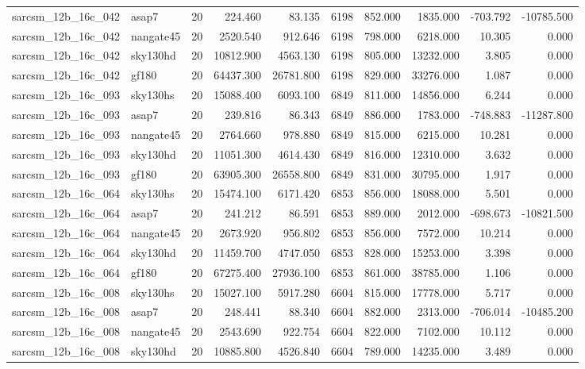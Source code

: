 \begin{tabular}{llrrrrrrrr}
sarcsm\_12b\_16c\_042 & asap7 & 20 & 224.460 & 83.135 & 6198 & 852.000 & 1835.000 & -703.792 & -10785.500 \\
sarcsm\_12b\_16c\_042 & nangate45 & 20 & 2520.540 & 912.646 & 6198 & 798.000 & 6218.000 & 10.305 & 0.000 \\
sarcsm\_12b\_16c\_042 & sky130hd & 20 & 10812.900 & 4563.130 & 6198 & 805.000 & 13232.000 & 3.805 & 0.000 \\
sarcsm\_12b\_16c\_042 & gf180 & 20 & 64437.300 & 26781.800 & 6198 & 829.000 & 33276.000 & 1.087 & 0.000 \\
sarcsm\_12b\_16c\_093 & sky130hs & 20 & 15088.400 & 6093.100 & 6849 & 811.000 & 14856.000 & 6.244 & 0.000 \\
sarcsm\_12b\_16c\_093 & asap7 & 20 & 239.816 & 86.343 & 6849 & 886.000 & 1783.000 & -748.883 & -11287.800 \\
sarcsm\_12b\_16c\_093 & nangate45 & 20 & 2764.660 & 978.880 & 6849 & 815.000 & 6215.000 & 10.281 & 0.000 \\
sarcsm\_12b\_16c\_093 & sky130hd & 20 & 11051.300 & 4614.430 & 6849 & 816.000 & 12310.000 & 3.632 & 0.000 \\
sarcsm\_12b\_16c\_093 & gf180 & 20 & 63905.300 & 26558.800 & 6849 & 831.000 & 30795.000 & 1.917 & 0.000 \\
sarcsm\_12b\_16c\_064 & sky130hs & 20 & 15474.100 & 6171.420 & 6853 & 856.000 & 18088.000 & 5.501 & 0.000 \\
sarcsm\_12b\_16c\_064 & asap7 & 20 & 241.212 & 86.591 & 6853 & 889.000 & 2012.000 & -698.673 & -10821.500 \\
sarcsm\_12b\_16c\_064 & nangate45 & 20 & 2673.920 & 956.802 & 6853 & 856.000 & 7572.000 & 10.214 & 0.000 \\
sarcsm\_12b\_16c\_064 & sky130hd & 20 & 11459.700 & 4747.050 & 6853 & 828.000 & 15253.000 & 3.398 & 0.000 \\
sarcsm\_12b\_16c\_064 & gf180 & 20 & 67275.400 & 27936.100 & 6853 & 861.000 & 38785.000 & 1.106 & 0.000 \\
sarcsm\_12b\_16c\_008 & sky130hs & 20 & 15027.100 & 5917.280 & 6604 & 815.000 & 17778.000 & 5.717 & 0.000 \\
sarcsm\_12b\_16c\_008 & asap7 & 20 & 248.441 & 88.340 & 6604 & 882.000 & 2313.000 & -706.014 & -10485.200 \\
sarcsm\_12b\_16c\_008 & nangate45 & 20 & 2543.690 & 922.754 & 6604 & 822.000 & 7102.000 & 10.112 & 0.000 \\
sarcsm\_12b\_16c\_008 & sky130hd & 20 & 10885.800 & 4526.840 & 6604 & 789.000 & 14235.000 & 3.489 & 0.000 \\

\end{tabular}

